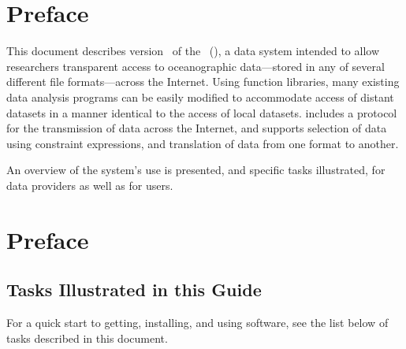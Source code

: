 %
%

\T\chapter*{Preface}
\T{}

This document describes version \OPDversion\ of the \OPD\ (\opendap), a
data system intended to allow researchers transparent access to
oceanographic data---stored in any of several different file
formats---across the Internet. Using \opendap function libraries, many
existing data analysis programs can be easily modified to accommodate
access of distant datasets in a manner identical to the access of
local datasets. \opendap includes a protocol for the transmission of data
across the Internet, and supports selection of data using constraint
expressions, and translation of data from one format to another.

An overview of the system's use is presented, and specific tasks
illustrated, for data providers as well as for users.

\W{}
\W\chapter*{Preface}

\section{Tasks Illustrated in this Guide}
\label{pref,tasks}

For a quick start to getting, installing, and using \opendap software, see the
list below of tasks described in this document.

